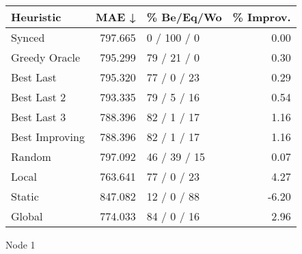 \begin{tabular}{lrlr}
\toprule
\textbf{Heuristic} & \textbf{MAE ↓} & \textbf{\% Be/Eq/Wo} & \textbf{\% Improv.} \\
\midrule
            Synced &        797.665 &          0 / 100 / 0 &                0.00 \\
     Greedy Oracle &        795.299 &          79 / 21 / 0 &                0.30 \\
         Best Last &        795.320 &          77 / 0 / 23 &                0.29 \\
       Best Last 2 &        793.335 &          79 / 5 / 16 &                0.54 \\
       Best Last 3 &        788.396 &          82 / 1 / 17 &                1.16 \\
    Best Improving &        788.396 &          82 / 1 / 17 &                1.16 \\
            Random &        797.092 &         46 / 39 / 15 &                0.07 \\
             Local &        763.641 &          77 / 0 / 23 &                4.27 \\
            Static &        847.082 &          12 / 0 / 88 &               -6.20 \\
            Global &        774.033 &          84 / 0 / 16 &                2.96 \\
\bottomrule
\end{tabular}
\caption{Node 1}
\label{tab:non_lr01_le1_bs4_1}
